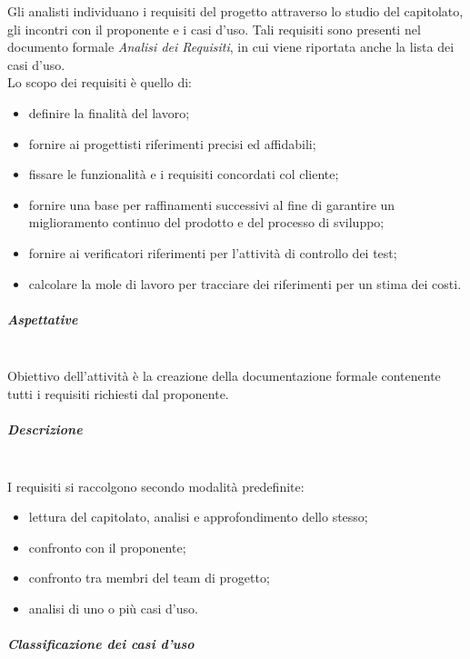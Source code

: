 Gli analisti individuano i requisiti del progetto attraverso lo studio del 
capitolato, gli incontri con il proponente e i casi d'uso. Tali requisiti sono 
presenti nel documento formale \textit{Analisi dei Requisiti}, in cui viene riportata 
anche la lista dei casi d'uso. \\
Lo scopo dei requisiti è quello di:
	\begin{itemize}
		\item definire la finalità del lavoro;
		\item fornire ai progettisti riferimenti precisi ed affidabili;
		\item fissare le funzionalità e i requisiti concordati col cliente;
		\item fornire  una  base  per  raffinamenti  successivi  al  fine  di  
			garantire  un miglioramento continuo del prodotto e del processo di sviluppo;
		\item fornire ai verificatori riferimenti per l'attività di controllo dei 
			test;
		\item calcolare la mole di lavoro per tracciare dei riferimenti per un stima 
			dei costi.
	\end{itemize}
	
\subparagraph{Aspettative} \mbox{}\\

Obiettivo dell'attività è la creazione della documentazione formale 
contenente tutti i requisiti richiesti dal proponente. \newline 
			
\subparagraph{Descrizione} \mbox{}\\

I requisiti si raccolgono secondo modalità predefinite:
	\begin{itemize}
		\item lettura del capitolato\glo, analisi e approfondimento dello stesso;
		\item confronto con il proponente;
		\item confronto tra membri del team di progetto;
		\item analisi di uno o più casi d'uso.  \\
	\end{itemize}
	

\subparagraph{Classificazione dei casi d'uso} \mbox{}\\

